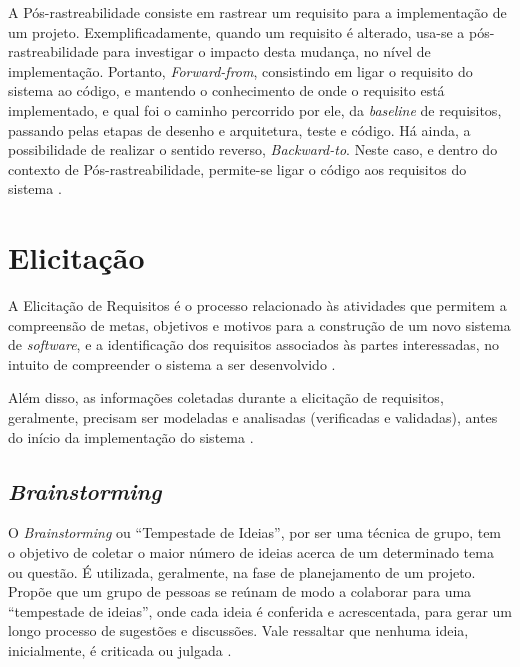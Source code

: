 \label{sec:pos-rastreabilidade}

A Pós-rastreabilidade consiste em rastrear um requisito para a implementação de um projeto. Exemplificadamente, quando um requisito é alterado, usa-se a pós-rastreabilidade para investigar o impacto desta mudança, no nível de implementação. Portanto, \textit{Forward-from}, consistindo em ligar o requisito do sistema ao código, e mantendo o conhecimento de onde o requisito está implementado, e qual foi o caminho percorrido por ele, da \textit{baseline} de requisitos, passando pelas etapas de desenho e arquitetura, teste e código. Há ainda, a possibilidade de realizar o sentido reverso, \textit{Backward-to}. Neste caso, e dentro do contexto de Pós-rastreabilidade, permite-se ligar o código aos requisitos do sistema \cite{pinheiro2004requirements}.

\section {Elicitação}

\label{sec:elicitacao}

A Elicitação de Requisitos é o processo relacionado às atividades que permitem a compreensão de metas, objetivos e motivos para a construção de um novo sistema de \textit{software}, e a identificação dos requisitos associados às partes interessadas, no intuito de compreender o sistema a ser desenvolvido \cite{elliott2012software}.

Além disso, as informações coletadas durante a elicitação de requisitos, geralmente, precisam ser modeladas e analisadas (verificadas e validadas), antes do início da implementação do sistema \cite{nuseibeh2000requirements}.

\subsection{\textit{Brainstorming}}

\label{sec:brainstorming}

O \textit{Brainstorming} ou “Tempestade de Ideias”, por ser uma técnica de grupo, tem o objetivo de coletar o maior número de ideias acerca de um determinado tema ou questão. É utilizada, geralmente, na fase de planejamento de um projeto. Propõe que um grupo de pessoas se reúnam de modo a colaborar para uma “tempestade de ideias”, onde cada ideia é conferida e acrescentada, para gerar um longo processo de sugestões e discussões. Vale ressaltar que nenhuma ideia, inicialmente, é criticada ou julgada \cite{mazzotti2012exploraccao}.

